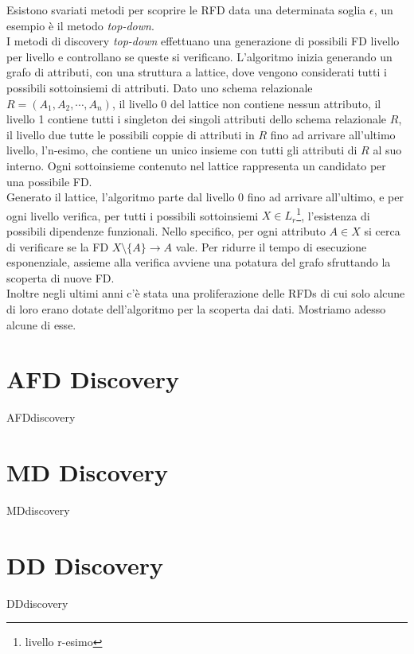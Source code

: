 Esistono svariati metodi per scoprire le RFD data una determinata soglia $\epsilon$, un esempio è il metodo \textit{top-down}.\\
I metodi di discovery \textit{top-down} effettuano una generazione di possibili FD livello per livello e controllano se queste si verificano. L'algoritmo inizia generando un grafo di attributi, con una struttura a lattice, dove vengono considerati tutti i possibili sottoinsiemi di attributi. Dato uno schema relazionale $R = (A_1, A_2, \cdots, A_n)$, il livello 0 del lattice non contiene nessun attributo, il livello 1 contiene tutti i singleton dei singoli attributi dello schema relazionale $R$, il livello due tutte le possibili coppie di attributi in $R$ fino ad arrivare all'ultimo livello, l'n-esimo, che contiene un unico insieme con tutti gli attributi di $R$ al suo interno. Ogni sottoinsieme contenuto nel lattice rappresenta un candidato per una possibile FD.\\
Generato il lattice, l'algoritmo parte dal livello 0 fino ad arrivare all'ultimo, e per ogni livello verifica, per tutti i possibili sottoinsiemi $X \in L_r$\footnote{livello r-esimo}, l'esistenza di possibili dipendenze funzionali. Nello specifico, per ogni attributo $A \in X$ si cerca di verificare se la FD $X \setminus \{A\} \rightarrow A$ vale. Per ridurre il tempo di esecuzione esponenziale, assieme alla verifica avviene una potatura del grafo sfruttando la scoperta di nuove FD.\\
Inoltre negli ultimi anni c'è stata una proliferazione delle RFDs di cui solo alcune di loro erano dotate dell'algoritmo per la scoperta dai dati. Mostriamo adesso alcune di esse.


\section{AFD Discovery}
{AFDdiscovery}
\section{MD Discovery}
{MDdiscovery}
\section{DD Discovery}
{DDdiscovery}